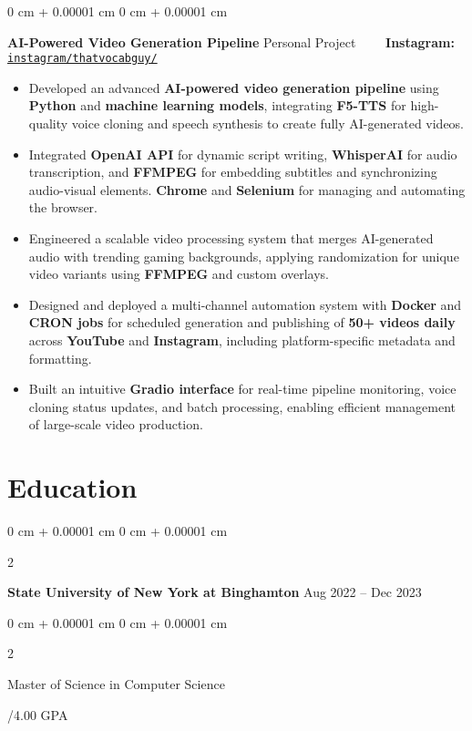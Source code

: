 \documentclass[10pt, letterpaper]{article}
\newenvironment{highlights}{
    \begin{itemize}[
        topsep=0.10 cm,
        parsep=0.10 cm,
        partopsep=0pt,
        itemsep=0pt,
        leftmargin=0 cm + 10pt
    ]
}{
    \end{itemize}
} %
\newenvironment{onecolentry}{
    \begin{adjustwidth}{
        0 cm + 0.00001 cm
    }{
        0 cm + 0.00001 cm
    }
}{
    \end{adjustwidth}
} %
\newenvironment{twocolentry}[2][]{
    \onecolentry
    \def\secondColumn{#2}
    \setcolumnwidth{\fill, 4.5 cm}
    \begin{paracol}{2}
}{
    \switchcolumn \raggedleft \secondColumn
    \end{paracol}
    \endonecolentry
} %
\begin{document}
\vspace{0.15 cm}

\begin{onecolentry}
	\textbf{AI-Powered Video Generation Pipeline} \hfill Personal Project \ \ \ \ \textbf{Instagram:} \href{https://www.instagram.com/thatvocabguy/}{\texttt{instagram/thatvocabguy/}}
	\begin{highlights}
		\item Developed an advanced \textbf{AI-powered video generation pipeline} using \textbf{Python} and \textbf{machine learning models}, integrating \textbf{F5-TTS} for high-quality voice cloning and speech synthesis to create fully AI-generated videos.
		\item Integrated \textbf{OpenAI API} for dynamic script writing, \textbf{WhisperAI} for audio transcription, and \textbf{FFMPEG} for embedding subtitles and synchronizing audio-visual elements. \textbf{Chrome} and \textbf{Selenium} for managing and automating the browser.
		\item Engineered a scalable video processing system that merges AI-generated audio with trending gaming backgrounds, applying randomization for unique video variants using \textbf{FFMPEG} and custom overlays.
		\item Designed and deployed a multi-channel automation system with \textbf{Docker} and \textbf{CRON jobs} for scheduled generation and publishing of \textbf{50+ videos daily} across \textbf{YouTube} and \textbf{Instagram}, including platform-specific metadata and formatting.
		\item Built an intuitive \textbf{Gradio interface} for real-time pipeline monitoring, voice cloning status updates, and batch processing, enabling efficient management of large-scale video production.
	\end{highlights}
\end{onecolentry}
	


\section{Education}
\begin{twocolentry}{
		Aug 2022 – Dec 2023
	}
	\textbf{State University of New York at Binghamton}\end{twocolentry}

\begin{twocolentry}{
		3.44/4.00 GPA
	}
	Master of Science in Computer Science
\end{twocolentry}
\end{document}
